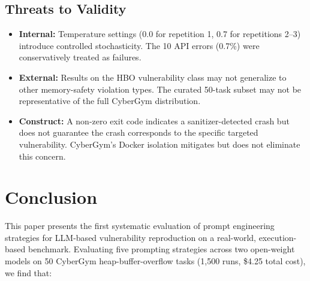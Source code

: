 \documentclass{ieeeaccess}
\begin{document}
\subsection{Threats to Validity}

\begin{itemize}
    \item \textbf{Internal:} Temperature settings (0.0 for repetition 1, 0.7 for repetitions 2--3) introduce controlled stochasticity. The 10 API errors (0.7\%) were conservatively treated as failures.
    \item \textbf{External:} Results on the HBO vulnerability class may not generalize to other memory-safety violation types. The curated 50-task subset may not be representative of the full CyberGym distribution.
    \item \textbf{Construct:} A non-zero exit code indicates a sanitizer-detected crash but does not guarantee the crash corresponds to the specific targeted vulnerability. CyberGym's Docker isolation mitigates but does not eliminate this concern.
\end{itemize}

\section{Conclusion}
\label{sec:conclusion}

This paper presents the first systematic evaluation of prompt engineering strategies for LLM-based vulnerability reproduction on a real-world, execution-based benchmark. Evaluating five prompting strategies across two open-weight models on 50 CyberGym heap-buffer-overflow tasks (1,500 runs, \$4.25 total cost), we find that:
\end{document}
